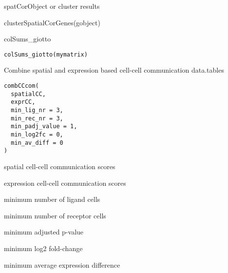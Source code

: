 \documentclass[a4paper]{book}
\begin{document}
%
\begin{Value}
spatCorObject or cluster results
\end{Value}
%
\begin{Examples}
\begin{ExampleCode}
    clusterSpatialCorGenes(gobject)
\end{ExampleCode}
\end{Examples}
%
\begin{Description}\relax
colSums\_giotto
\end{Description}
%
\begin{Usage}
\begin{verbatim}
colSums_giotto(mymatrix)
\end{verbatim}
\end{Usage}
%
\begin{Description}\relax
Combine spatial and expression based cell-cell communication data.tables
\end{Description}
%
\begin{Usage}
\begin{verbatim}
combCCcom(
  spatialCC,
  exprCC,
  min_lig_nr = 3,
  min_rec_nr = 3,
  min_padj_value = 1,
  min_log2fc = 0,
  min_av_diff = 0
)
\end{verbatim}
\end{Usage}
%
\begin{Arguments}
\begin{ldescription}
\item[\code{spatialCC}] spatial cell-cell communication scores

\item[\code{exprCC}] expression cell-cell communication scores

\item[\code{min\_lig\_nr}] minimum number of ligand cells

\item[\code{min\_rec\_nr}] minimum number of receptor cells

\item[\code{min\_padj\_value}] minimum adjusted p-value

\item[\code{min\_log2fc}] minimum log2 fold-change

\item[\code{min\_av\_diff}] minimum average expression difference
\end{ldescription}
\end{Arguments}
\end{document}
